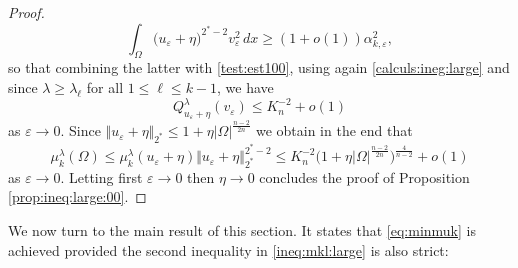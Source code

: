\documentclass[10pt]{amsart}
\numberwithin{equation}{section}
\newcommand{\ve}{\varepsilon}
\newcommand{\Om}{\Omega}
\newcommand{\mkl}{\mu_{k}^{\lambda}}
\theoremstyle{plain}
\theoremstyle{remark}
\begin{document}
\begin{proof}
$$\int_{\Om} \big(u_{\ve} + \eta \big)^{2^*-2}v_\ve^2\, dx  \ge (1+o(1)) \alpha_{k,\ve}^2,$$ 
so that combining the latter with \eqref{test:est100}, using again \eqref{calculs:ineg:large} and since $\lambda \ge \lambda_\ell$ for all $1 \le \ell \le k-1$, we have 
 $$ Q_{u_\ve + \eta}^{\lambda}(v_\ve)  \le K_n^{-2} + o(1) $$
as $\ve \to 0$. Since $\Vert u_\ve + \eta \Vert_{2^*} \le  1 + \eta |\Om|^{\frac{n-2}{2n}}$ we obtain in the end that 
$$\mkl(\Om) \le  \mkl(u_\ve + \eta) \Vert u_\ve + \eta \Vert_{2^*}^{2^*-2} \le K_n^{-2}\big(1 + \eta |\Om|^{\frac{n-2}{2n}}\big)^{\frac{4}{n-2}} + o(1) $$
as $\ve \to 0$. Letting first $\ve \to 0$ then $\eta \to 0$ concludes the proof of Proposition \ref{prop:ineq:large:00}.
\end{proof}
We now turn to the main result of this section. It states that \eqref{eq:minmuk} is achieved provided the second inequality in \eqref{ineq:mkl:large} is also strict: 
\end{document}
